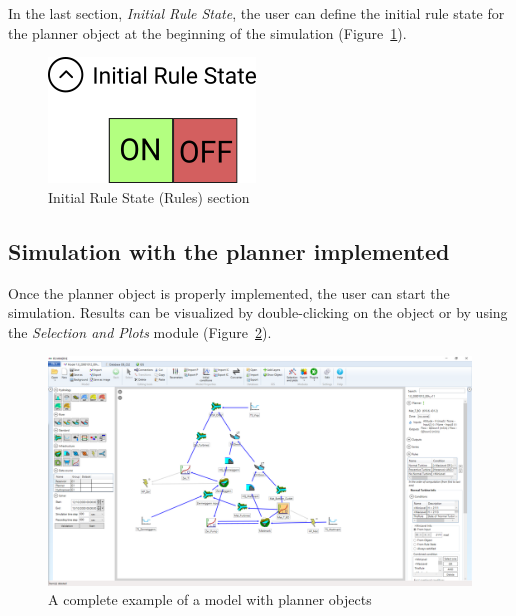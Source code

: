 \documentclass[
  letterpaper,
  DIV=11,
  numbers=noendperiod]{scrreprt}
\begin{document}
In the last section, \emph{Initial Rule State}, the user can define the
initial rule state for the planner object at the beginning of the
simulation (Figure~\ref{fig-planner_initial_rule_state_section}).

\begin{figure}

{\centering \includegraphics{./figures/fig-planner_initial_rule_state_section.png}

}

\caption{\label{fig-planner_initial_rule_state_section}Initial Rule
State (Rules) section}

\end{figure}

\hypertarget{simulation-with-the-planner-implemented}{%
\subsection{Simulation with the planner
implemented}\label{simulation-with-the-planner-implemented}}

Once the planner object is properly implemented, the user can start the
simulation. Results can be visualized by double-clicking on the object
or by using the \emph{Selection and Plots} module
(Figure~\ref{fig-complete_model_with_planner}).

\begin{figure}

{\centering \includegraphics{./figures/fig-complete_model_with_planner.png}

}

\caption{\label{fig-complete_model_with_planner}A complete example of a
model with planner objects}

\end{figure}
\end{document}
